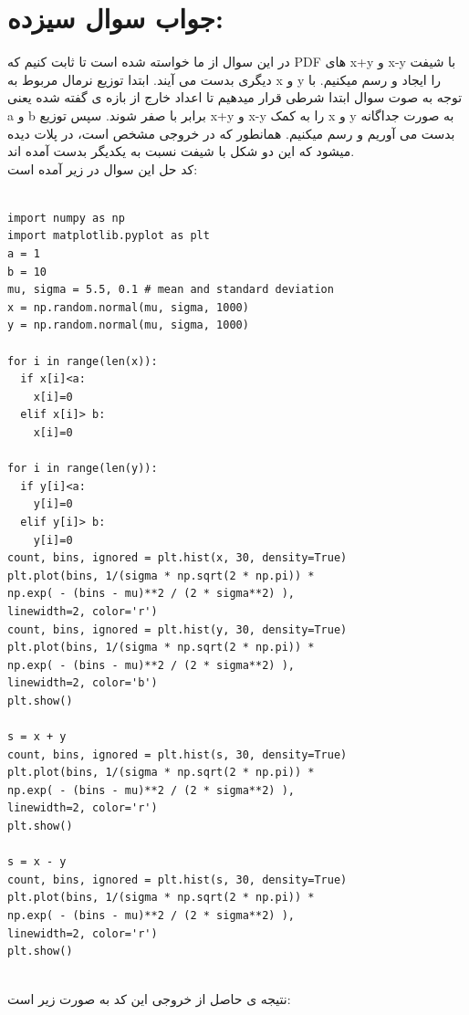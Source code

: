 \documentclass[a4paper,14pt]{article}
\begin{document}
\section*{جواب سوال سیزده:}

در این  سوال از ما خواسته شده است تا ثابت کنیم که PDF های x+y و x-y با شیفت دیگری بدست می آیند. ابتدا توزیع نرمال مربوط به x و y را ایجاد و رسم میکنیم. با توجه به صوت سوال ابتدا شرطی قرار میدهیم تا اعداد خارج از بازه ی گفته شده یعنی a و b برابر با صفر شوند. سپس توزیع x+y و x-y را به کمک x و y به صورت جداگانه بدست می آوریم و رسم میکنیم. همانطور که در خروجی مشخص است، در پلات دیده میشود که این دو  شکل با شیفت نسبت به یکدیگر بدست آمده اند.\\

کد حل این سوال در زیر آمده است:\\

\fontsize{12}{12}\selectfont
\begin{latin}
	\begin{lstlisting}
		
import numpy as np
import matplotlib.pyplot as plt
a = 1
b = 10
mu, sigma = 5.5, 0.1 # mean and standard deviation
x = np.random.normal(mu, sigma, 1000)
y = np.random.normal(mu, sigma, 1000)

for i in range(len(x)):
  if x[i]<a:
    x[i]=0
  elif x[i]> b:
    x[i]=0

for i in range(len(y)):
  if y[i]<a:
    y[i]=0
  elif y[i]> b:
    y[i]=0
count, bins, ignored = plt.hist(x, 30, density=True)
plt.plot(bins, 1/(sigma * np.sqrt(2 * np.pi)) *
np.exp( - (bins - mu)**2 / (2 * sigma**2) ),
linewidth=2, color='r')
count, bins, ignored = plt.hist(y, 30, density=True)
plt.plot(bins, 1/(sigma * np.sqrt(2 * np.pi)) *
np.exp( - (bins - mu)**2 / (2 * sigma**2) ),
linewidth=2, color='b')
plt.show()

s = x + y
count, bins, ignored = plt.hist(s, 30, density=True)
plt.plot(bins, 1/(sigma * np.sqrt(2 * np.pi)) *
np.exp( - (bins - mu)**2 / (2 * sigma**2) ),
linewidth=2, color='r')
plt.show()

s = x - y
count, bins, ignored = plt.hist(s, 30, density=True)
plt.plot(bins, 1/(sigma * np.sqrt(2 * np.pi)) *
np.exp( - (bins - mu)**2 / (2 * sigma**2) ),
linewidth=2, color='r')
plt.show()
		
	\end{lstlisting}
\end{latin}
\fontsize{14}{14}\selectfont


نتیجه ی حاصل از خروجی این کد به صورت زیر است:\\
\end{document}

